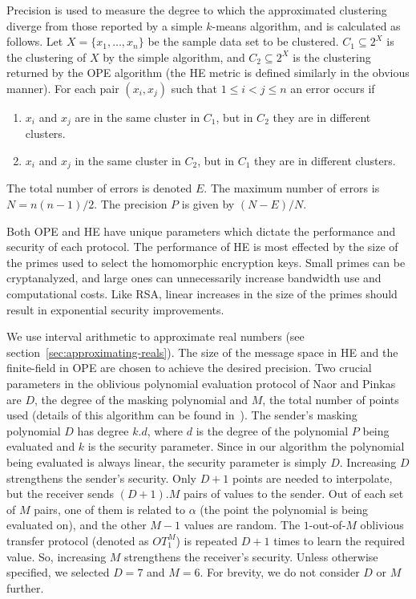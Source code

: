 Precision is used to measure the degree to which the approximated
clustering diverge from those reported by a simple $k$-means
algorithm, and is calculated as follows.  Let $X = \{x_1, \dots,
x_n\}$ be the sample data set to be clustered.  $C_1 \subseteq 2^X$ is
the clustering of $X$ by the simple algorithm, and $C_2 \subseteq 2^X$
is the clustering returned by the OPE algorithm (the HE metric is
defined similarly in the obvious manner).  For each pair $(x_i,x_j)$
such that $1 \leq i < j \leq n$ an error occurs if

\vspace{-4pt}

\itembase
\begin{enumerate}
\itembase
\item 
$x_i$ and $x_j$ are in the same cluster in $C_1$, but in $C_2$
they are in different clusters.

\item
$x_i$ and $x_j$ in the same cluster in $C_2$, but in $C_1$
they are in different clusters.
\end{enumerate}

\vspace{-4pt}

\noindent
The total number of errors is denoted $E$.  The maximum number of
errors is $N = n(n-1)/2$.  The precision $P$ is given by $(N-E)/N$.

Both OPE and HE have unique parameters which dictate the performance
and security of each protocol.  The performance of HE is most
effected by the size of the primes used to select the homomorphic
encryption keys.  Small primes can be cryptanalyzed, and large ones
can unnecessarily increase bandwidth use and computational costs.
Like RSA, linear increases in the size of the primes should result in
exponential security improvements.

We use interval arithmetic to approximate real numbers (see
section~\ref{sec:approximating-reals}).  The size of the message space in
HE and the finite-field in OPE are chosen to achieve the desired
precision.  Two crucial parameters in the
oblivious polynomial evaluation protocol of Naor and Pinkas are $D$,
the degree of the masking polynomial and $M$, the total number of
points used (details of this algorithm can be found
in~\cite{NaorPinkas99}). The sender's masking polynomial $D$ has
degree $k .  d$, where $d$ is the degree of the polynomial $P$
being evaluated and $k$ is the security parameter.  Since in our
algorithm the polynomial being evaluated is always linear, the
security parameter is simply $D$.  Increasing $D$ strengthens the
sender's security.  Only $D+1$ points are needed to interpolate, but
the receiver sends $(D+1) . M$ pairs of values to the sender.  Out
of each set of $M$ pairs, one of them is related to $\alpha$ (the
point the polynomial is being evaluated on), and the other $M-1$
values are random.  The $1$-out-of-$M$ oblivious transfer protocol
(denoted as $OT_1^M$) is repeated $D+1$ times to learn the required
value.  So, increasing $M$ strengthens the receiver's security.
Unless otherwise specified, we selected $D=7$ and $M=6$.  For brevity,
we do not consider $D$ or $M$ further.

